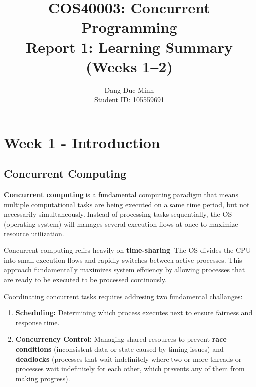 \documentclass[11pt,a4paper]{article}
\title{\textbf{COS40003: Concurrent Programming} \\ \Large Report 1: Learning Summary (Weeks 1--2)}
\author{Dang Duc Minh \\[0.3em]     Student ID: 105559691}
\date{}
\begin{document}
\maketitle  
\tableofcontents
\newpage

\section{Week 1 - Introduction}

\subsection{Concurrent Computing}
\textbf{Concurrent computing} is a fundamental computing paradigm that means multiple computational 
tasks are being executed on a same time period, but not necessarily 
simultaneously. Instead of processing tasks sequentially, the OS (operating system) will manages 
several execution flows at once to maximize resource utilization.

\hspace{5pt}

\noindent Concurrent computing relies heavily on \textbf{time-sharing}. The OS divides 
the CPU into small execution flows and rapidly switches between active processes. This approach
fundamentally maximizes system effciency by allowing processes that are ready to be executed to be
processed continously.

\hspace{5pt}

\noindent Coordinating concurrent tasks requires addresing two fundamental challanges:
 

\begin{enumerate}
    \item \textbf{Scheduling:} Determining which process executes next to ensure fairness and response time.
    \item \textbf{Concurrency Control:} Managing shared resources to prevent \textbf{race conditions} (inconsistent data or state caused by timing issues) and \textbf{deadlocks} (processes that wait indefinitely where two or more threads or processes wait indefinitely for each other, which prevents any of them from making progress).
\end{enumerate}
\end{document}
